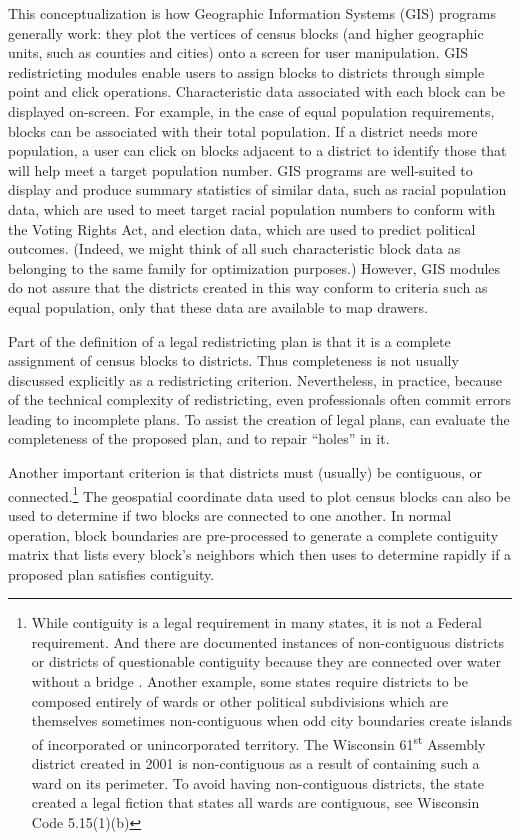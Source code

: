 \documentclass[article]{JSSstyle/jss}
\begin{document}
This conceptualization is how Geographic Information Systems (GIS) 
programs generally work: they plot the vertices of census blocks (and higher geographic 
units, such as counties and cities) onto a screen for user 
manipulation. GIS redistricting modules enable users to assign 
blocks to districts through simple point and click operations. 
Characteristic data associated with each block can be displayed 
on-screen.  For example, in the case of equal population 
requirements, blocks can be associated with their total population.  
If a district needs more population, a user can click on blocks 
adjacent to a district to identify those that will help meet a 
target population number.  GIS programs are well-suited to display 
and produce summary statistics of similar data, such as racial 
population data, which are used to meet target racial population 
numbers to conform with the Voting Rights Act, and election data, 
which are used to predict political outcomes. (Indeed, we might think 
of all such characteristic block data as belonging to the same 
family for optimization purposes.) However, GIS modules do not assure that the districts created in this way conform to criteria such as equal population, only that these data are available to map drawers.

Part of the definition of a legal redistricting plan is that it 
is a complete assignment of census blocks to districts. Thus completeness 
is not usually discussed explicitly as a redistricting criterion. Nevertheless, 
in practice, because of the technical complexity of redistricting, even professionals often commit errors leading to incomplete plans. To 
assist the creation of legal plans,  can evaluate the 
completeness of the proposed plan, and to repair ``holes'' in it. 

Another important criterion is that districts must (usually) be contiguous, or 
connected.\footnote{While contiguity is  a legal requirement in many states, it is
not a Federal requirement. And there are documented instances of 
non-contiguous districts or districts of questionable contiguity because 
they are connected over water without a bridge \citep[][]{Altman98}.  
Another example, some states require districts to be composed entirely 
of wards or other political subdivisions which are themselves sometimes non-contiguous when odd city boundaries create islands of 
incorporated or unincorporated territory.  The Wisconsin 61\textsuperscript{st} Assembly district created in 2001 is non-contiguous 
as a result of containing such a ward on its perimeter.  To 
avoid having non-contiguous districts, the state created a legal 
fiction that states all wards are contiguous, see Wisconsin Code 5.15(1)(b)}   
The geospatial coordinate data used to plot census blocks can also be used to determine if two blocks are connected to one another.  In normal operation,
block boundaries are pre-processed to generate a complete contiguity matrix that  
lists every block's neighbors which  then uses to determine rapidly if 
a proposed plan satisfies contiguity.
\end{document}
